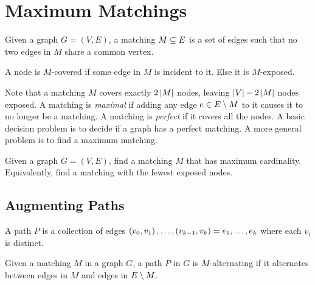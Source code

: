 \section{Maximum Matchings}
\label{sec:max_matchings}

\newcommand{\maxmatch}{\hyperref[prob:max_matching]{\color{black}\textsf{Maximum Matching}}}
\newcommand{\symdiff}{\ensuremath{\bigtriangleup}}


\begin{definition}[Matching]
    Given a graph $G = (V, E)$, a matching $M \subseteq E$ is a set of edges such that no two edges in $M$ share 
    a common vertex. 
    \label{def:matching}
    \begin{definition}
        A node is $M$-covered if some edge in $M$ is incident to it. Else it is $M$-exposed. 
    \end{definition}
\end{definition}

Note that a matching $M$ covers exactly $2\left\lvert M \right\rvert$ nodes, leaving $\left\lvert V \right\rvert - 2\left\lvert M \right\rvert$ nodes exposed. 
A matching is \emph{maximal} if adding any edge $e \in E \setminus M$ to it causes it to no longer be a matching. 
A matching is \emph{perfect} if it covers all the nodes. 
A basic decision problem is to decide if a graph has a perfect matching. 
A more general problem is to find a maximum matching. 

\begin{problem}
    Given a graph $G = (V, E)$, find a matching $M$ that has maximum cardinality. Equivalently, find a 
    matching with the fewest exposed nodes. 
    \label{prob:max_matching}
\end{problem}

\subsection{Augmenting Paths}

A path $P$ is a collection of edges $\left( v_0, v_1 \right), \ldots, \left( v_{k-1}, v_k \right) = e_1, \ldots, e_k $ where each $v_i$ is distinct.   

\begin{definition}
    Given a matching $M$ in a graph $G$, a path $P$ in $G$ is $M$-alternating if it alternates
    between edges in $M$ and edges in $E \setminus M$. 
    \label{def:alternate_path}
\end{definition}

